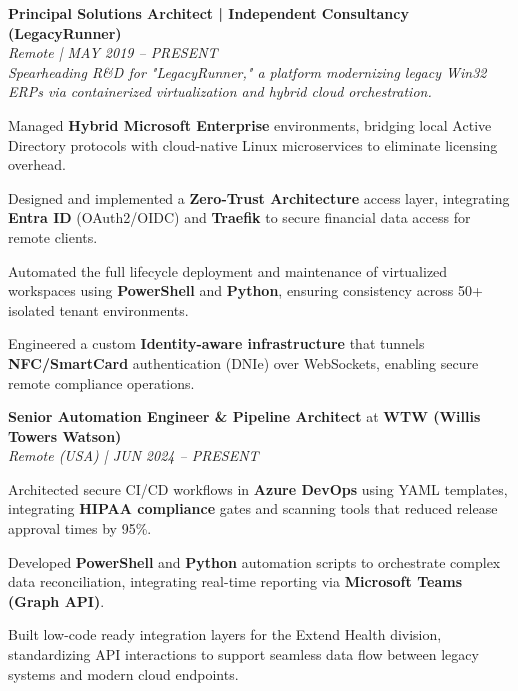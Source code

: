 
\item \label{job:consultancy}
\textbf{Principal Solutions Architect | Independent Consultancy (LegacyRunner)} \\
\textit{Remote | MAY 2019 – PRESENT} \\
\textit{Spearheading R\&D for "LegacyRunner," a platform modernizing legacy Win32 ERPs via containerized virtualization and hybrid cloud orchestration.}
\resumeItemListStart
    \item Managed \textbf{Hybrid Microsoft Enterprise} environments, bridging local Active Directory protocols with cloud-native Linux microservices to eliminate licensing overhead.
    \item Designed and implemented a \textbf{Zero-Trust Architecture} access layer, integrating \textbf{Entra ID} (OAuth2/OIDC) and \textbf{Traefik} to secure financial data access for remote clients.
    \item Automated the full lifecycle deployment and maintenance of virtualized workspaces using \textbf{PowerShell} and \textbf{Python}, ensuring consistency across 50+ isolated tenant environments.
    \item Engineered a custom \textbf{Identity-aware infrastructure} that tunnels \textbf{NFC/SmartCard} authentication (DNIe) over WebSockets, enabling secure remote compliance operations.
\resumeItemListEnd

\item \label{job:wtw}
\textbf{Senior Automation Engineer \& Pipeline Architect} at \textbf{WTW (Willis Towers Watson)} \\
\textit{Remote (USA) | JUN 2024 – PRESENT}
\resumeItemListStart
    \item Architected secure CI/CD workflows in \textbf{Azure DevOps} using YAML templates, integrating \textbf{HIPAA compliance} gates and scanning tools that reduced release approval times by 95\%.
    \item Developed \textbf{PowerShell} and \textbf{Python} automation scripts to orchestrate complex data reconciliation, integrating real-time reporting via \textbf{Microsoft Teams (Graph API)}.
    \item Built low-code ready integration layers for the Extend Health division, standardizing API interactions to support seamless data flow between legacy systems and modern cloud endpoints.
\resumeItemListEnd


